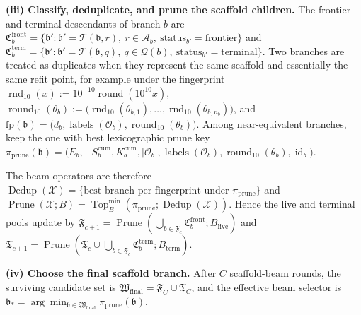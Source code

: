 \documentclass[11pt]{article}
\begin{document}
\textbf{(iii) Classify, deduplicate, and prune the scaffold children.}
The frontier and terminal descendants of branch \(b\) are \(\mathfrak C_b^{\mathrm{front}}=\{\mathfrak b' : \mathfrak b'=\mathcal T(\mathfrak b,r),\ r\in\mathcal A_b,\ \mathrm{status}_{b'}=\mathrm{frontier}\}\) and \(\mathfrak C_b^{\mathrm{term}}=\{\mathfrak b' : \mathfrak b'=\mathcal T(\mathfrak b,q),\ q\in\mathcal Q(b),\ \mathrm{status}_{b'}=\mathrm{terminal}\}\). Two branches are treated as duplicates when they represent the same scaffold and essentially the same refit point, for example under the fingerprint \(\operatorname{rnd}_{10}(x):=10^{-10}\operatorname{round}(10^{10}x)\), \(\operatorname{round}_{10}(\theta_b):=\bigl(\operatorname{rnd}_{10}(\theta_{b,1}),\dots,\operatorname{rnd}_{10}(\theta_{b,n_b})\bigr)\), and \(\mathrm{fp}(\mathfrak b)=\bigl(d_b,\operatorname{labels}(\mathcal O_b),\operatorname{round}_{10}(\theta_b)\bigr)\). Among near-equivalent branches, keep the one with best lexicographic prune key \(\pi_{\mathrm{prune}}(\mathfrak b)=\bigl(E_b,-S_b^{\mathrm{cum}},K_b^{\mathrm{cum}},|\mathcal O_b|,\operatorname{labels}(\mathcal O_b),\operatorname{round}_{10}(\theta_b),\operatorname{id}_b\bigr)\).

The beam operators are therefore \(\operatorname{Dedup}(\mathcal X)=\{\text{best branch per fingerprint under }\pi_{\mathrm{prune}}\}\) and \(\operatorname{Prune}(\mathcal X;B)=\operatorname{Top}^{\min}_B\!\left(\pi_{\mathrm{prune}};\operatorname{Dedup}(\mathcal X)\right)\). Hence the live and terminal pools update by \(\mathfrak F_{c+1}=\operatorname{Prune}\!\left(\bigcup_{b\in\mathfrak F_c}\mathfrak C_b^{\mathrm{front}};B_{\mathrm{live}}\right)\) and \(\mathfrak T_{c+1}=\operatorname{Prune}\!\left(\mathfrak T_c\cup\bigcup_{b\in\mathfrak F_c}\mathfrak C_b^{\mathrm{term}};B_{\mathrm{term}}\right)\).

\textbf{(iv) Choose the final scaffold branch.}
After \(C\) scaffold-beam rounds, the surviving candidate set is \(\mathfrak W_{\mathrm{final}}=\mathfrak F_C\cup\mathfrak T_C\), and the effective beam selector is \(\mathfrak b_*=\arg\min_{\mathfrak b\in\mathfrak W_{\mathrm{final}}}\pi_{\mathrm{prune}}(\mathfrak b)\).
\end{document}
